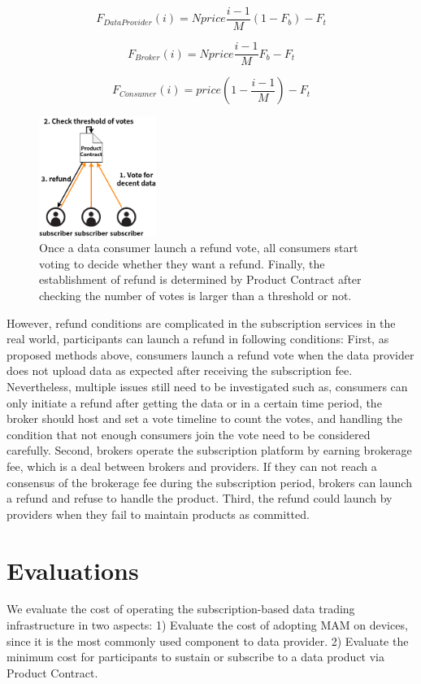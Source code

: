 \documentclass[conference]{IEEEtran}
\begin{document}
\begin{equation}
    F_{DataProvider}(i) = Nprice \frac{i-1}{M} (1-F_{b}) -F_{t}
\end{equation}

\begin{equation}
    F_{Broker}(i) = Nprice \frac{i-1}{M} F_{b} -F_{t}
\end{equation}

\begin{equation}
    F_{Consumer}(i) = price (1-\frac{i-1}{M}) -F_{t}
\end{equation}

\begin{figure}[h]
    \centering
    \includegraphics[width=1.5in]{refund}
    \caption{Once a data consumer launch a refund vote, all consumers start voting to decide whether they want a refund. Finally, the establishment of refund is determined by Product Contract after checking the number of votes is larger than a threshold or not.}
    \label{fig:refund}
\end{figure}

However, refund conditions are complicated in the subscription services in the real world, participants can launch a refund in following conditions: First, as proposed methods above, consumers launch a refund vote when the data provider does not upload data as expected after receiving the subscription fee. Nevertheless, multiple issues still need to be investigated such as, consumers can only initiate a refund after getting the data or in a certain time period, the broker should host and set a vote timeline to count the votes, and handling the condition that not enough consumers join the vote need to be considered carefully. Second, brokers operate the subscription platform by earning brokerage fee, which is a deal between brokers and providers. If they can not reach a consensus of the brokerage fee during the subscription period, brokers can launch a refund and refuse to handle the product. Third, the refund could launch by providers when they fail to maintain products as committed.

\section{Evaluations}
\label{section:evaluation}
We evaluate the cost of operating the subscription-based data trading infrastructure in two aspects: 1) Evaluate the cost of adopting MAM on devices, since it is the most commonly used component to data provider. 2) Evaluate the minimum cost for participants to sustain or subscribe to a data product via Product Contract.
\end{document}
